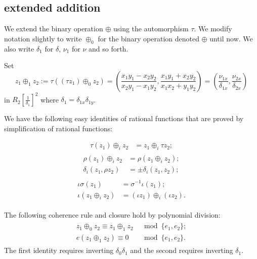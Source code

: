 \documentclass[12pt]{article}
\newcommand{\f}[1]{\frac{1}{#1}}
\begin{document}
\subsection{extended addition}

We extend the binary operation $\oplus$ using the automorphism $\tau$.
We modify notation slightly to write $\oplus_0$ for the binary
operation denoted $\oplus$ until now.  We also write $\delta_1$ for
$\delta$, $\nu_1$ for $\nu$ and so forth.

Set
\begin{equation}\label{eqn:tauplus}
z_1\oplus_1 z_2 := \tau((\tau z_1)\oplus_0 z_2)= \left(\frac{x_1y_1 - x_2 y_2}{x_2
    y_1-x_1 y_2},\frac{x_1 y_1 + x_2 y_2}{x_1 x_2 + y_1 y_2}\right) 
= (\frac{\nu_{1x}}{\delta_{1x}},\frac{\nu_{2x}}{\delta_{2x}})
\end{equation}
in $R_2[\f{\delta_1}]^2$ where $\delta_1 = \delta_{1x}\delta_{1y}$.

We have the following easy identities of rational functions that are
proved by simplification of rational functions:

\begin{align}\label{eqn:r-tau}
\tau (z_1)\oplus_i z_2 &= z_1 \oplus_i \tau z_2;
\end{align}
\begin{align}\label{eqn:r-rho}
\begin{split}
\rho(z_1)\oplus_i z_2 &= \rho(z_1\oplus_i z_2);\\
\delta_i(z_1,\rho z_2) &= \pm \delta_i(z_1,z_2);
\end{split}
\end{align}
\begin{align}\label{eqn:r-iota}
\begin{split}
\iota \sigma(z_1) &= \sigma^{-1} \iota (z_1);\\
\iota (z_1\oplus_i z_2) &= (\iota z_1)\oplus_i (\iota z_2).
\end{split}
\end{align}

The following coherence rule and closure hold by polynomial division:
\begin{align}\label{eqn:r-coh}
\begin{split}
z_1 \oplus_0 z_2 \equiv z_1 \oplus_1 z_2 &\mod \{e_1,e_2\};\\
e(z_1\oplus_1 z_2) \equiv 0 &\mod \{e_1,e_2\}.
\end{split}
\end{align}
The first identity requires inverting $\delta_0\delta_1$ and the
second requires inverting $\delta_1$.
\end{document}
